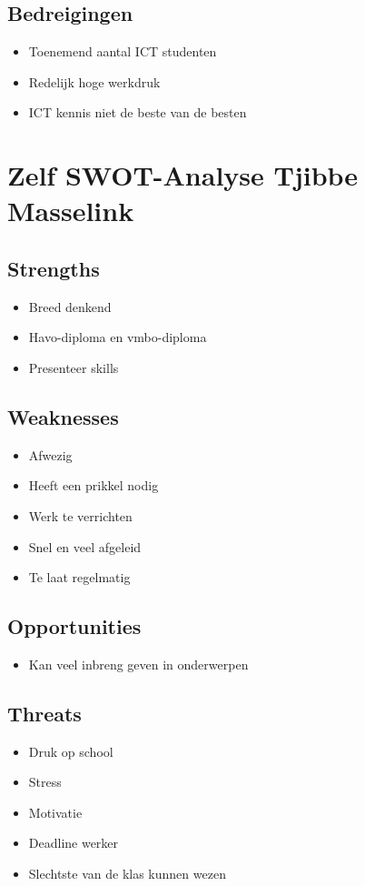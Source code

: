 \subsection{Bedreigingen}
\begin{itemize}
\item Toenemend aantal ICT studenten
\item Redelijk hoge werkdruk
\item ICT kennis niet de beste van de besten
\end{itemize}

\section{Zelf SWOT-Analyse Tjibbe Masselink}
\subsection{Strengths}
\begin{itemize}
\item
  Breed denkend
\item
  Havo-diploma en vmbo-diploma
\item
  Presenteer skills
\end{itemize}

\subsection{Weaknesses}
\begin{itemize}
\item
  Afwezig
\item
  Heeft een prikkel nodig
\item
  Werk te verrichten
\item
  Snel en veel afgeleid
\item
  Te laat regelmatig
\end{itemize}

\subsection{Opportunities}
\begin{itemize}
\item
  Kan veel inbreng geven in onderwerpen
\end{itemize}

\subsection{Threats}
\begin{itemize}
\item
  Druk op school
\item
  Stress
\item
  Motivatie
\item
  Deadline werker
\item
  Slechtste van de klas kunnen wezen
\end{itemize}

